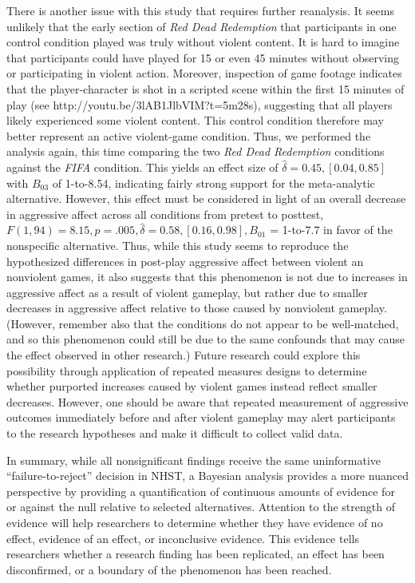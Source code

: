 \documentclass[man]{apa6}
\begin{document}
There is another issue with this study that requires further reanalysis. It seems unlikely that the early section of {\em Red Dead Redemption} that participants in one control condition played was truly without violent content. It is hard to imagine that participants could have played for 15 or even 45 minutes without observing or participating in violent action. Moreover, inspection of game footage indicates that the player-character is shot in a scripted scene within the first 15 minutes of play (see http://youtu.be/3lAB1JlbVIM?t=5m28s), suggesting that all players likely experienced some violent content. This control condition therefore may better represent an active violent-game condition.  Thus, we performed the analysis again, this time comparing the two {\em Red Dead Redemption} conditions against the {\em FIFA} condition. This yields an effect size of $\hat{\delta} = 0.45, [0.04, 0.85]$  with  $B_{03}$ of 1-to-8.54, indicating fairly strong support for the meta-analytic alternative. However, this effect must be considered in light of an overall decrease in aggressive affect across all conditions from pretest to posttest, $F(1, 94) = 8.15, p = .005, \hat{\delta} = 0.58, [0.16, 0.98], B_{01}$ = 1-to-7.7 in favor of the nonspecific alternative. Thus, while this study seems to reproduce the hypothesized differences in post-play aggressive affect between violent an nonviolent games, it also suggests that this phenomenon is not due to increases in aggressive affect as a result of violent gameplay, but rather due to smaller decreases in aggressive affect relative to those caused by nonviolent gameplay. (However, remember also that the conditions do not appear to be well-matched, and so this phenomenon could still be due to the same confounds that may cause the effect observed in other research.) Future research could explore this possibility through application of repeated measures designs to determine whether purported increases caused by violent games instead reflect smaller decreases. However, one should be aware that repeated measurement of aggressive outcomes immediately before and after violent gameplay may alert participants to the research hypotheses and make it difficult to collect valid data. 

In summary, while all nonsignificant findings receive the same uninformative ``failure-to-reject'' decision in NHST, a Bayesian analysis provides a more nuanced perspective by providing a quantification of continuous amounts of evidence for or against the null relative to selected alternatives. Attention to the strength of evidence will help researchers to determine whether they have evidence of no effect, evidence of an effect, or inconclusive evidence. This evidence tells researchers whether a research finding has been replicated, an effect has been disconfirmed, or a boundary of the phenomenon has been reached.
\end{document}
